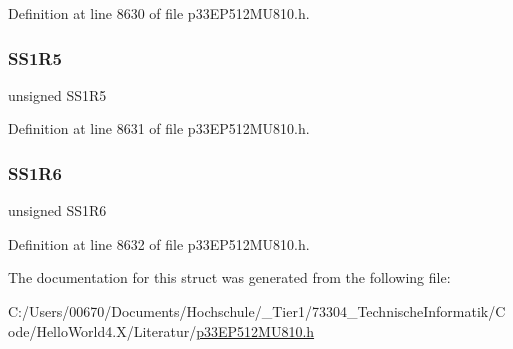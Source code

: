 Definition at line 8630 of file p33\+E\+P512\+M\+U810.\+h.

\mbox{\label{structtag_r_p_i_n_r21_b_i_t_s_a0ebd3b8fed5f6ba83e1c1a06c1fe2277}} 
\subsubsection{\texorpdfstring{S\+S1\+R5}{SS1R5}}
{\footnotesize\ttfamily unsigned S\+S1\+R5}



Definition at line 8631 of file p33\+E\+P512\+M\+U810.\+h.

\mbox{\label{structtag_r_p_i_n_r21_b_i_t_s_afe38c0d1f022f5013407f013eb9c644f}} 
\subsubsection{\texorpdfstring{S\+S1\+R6}{SS1R6}}
{\footnotesize\ttfamily unsigned S\+S1\+R6}



Definition at line 8632 of file p33\+E\+P512\+M\+U810.\+h.



The documentation for this struct was generated from the following file\+:\begin{DoxyCompactItemize}
\item 
C\+:/\+Users/00670/\+Documents/\+Hochschule/\+\_\+\+Tier1/73304\+\_\+\+Technische\+Informatik/\+Code/\+Hello\+World4.\+X/\+Literatur/\hyperlink{p33_e_p512_m_u810_8h}{p33\+E\+P512\+M\+U810.\+h}\end{DoxyCompactItemize}
